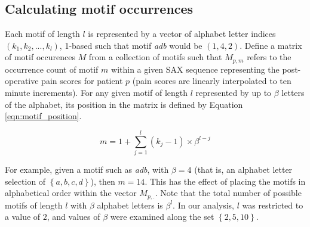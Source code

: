 \subsection{Calculating  motif occurrences}
Each motif of length $l$ is represented by a vector of alphabet letter indices $\left(k_1,k_2,...,k_l\right)$, 1-based such that motif \emph{adb} would be $\left(1,4,2\right)$. Define a matrix of motif occurences $M$ from a collection of motifs such that $M_{p,m}$ refers to the occurrence count of motif $m$ within a given SAX sequence representing the post-operative pain scores for patient $p$ (pain scores are linearly interpolated to ten minute increments). For any given motif of length $l$ represented by up to $\beta$ letters of the alphabet, its position in the matrix is defined by Equation \eqref{eqn:motif_position}.

\begin{equation}\label{eqn:motif_position}
    m = 1+\sum\limits_{j=1}^l \left(k_j-1\right)\times\beta^{l-j}
\end{equation}

For example, given a motif such as \emph{adb}, with $\beta=4$ (that is, an alphabet letter selection of $\left\{a,b,c,d\right\}$), then $m=14$. This has the effect of placing the motifs in alphabetical order within the vector $M_{p,.}$. Note that the total number of possible motifs of length $l$ with $\beta$ alphabet letters is $\beta^l$. In our analysis, $l$ was restricted to a value of $2$, and values of $\beta$ were examined along the set $\left\{2,5,10\right\}$.
